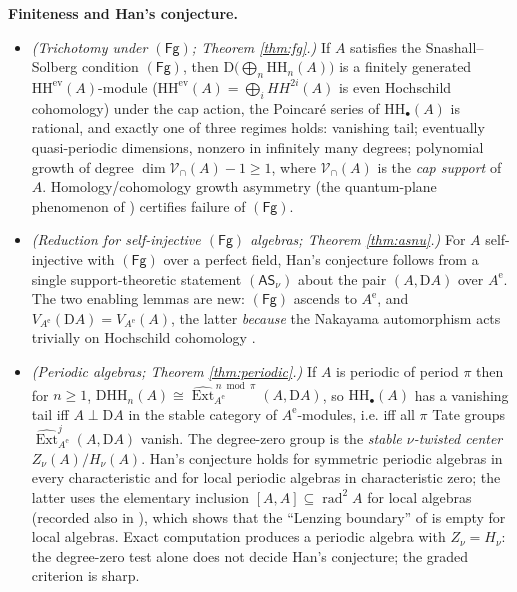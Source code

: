 \documentclass[11pt]{amsart}
\theoremstyle{definition}
\newcommand{\HH}{\mathrm{HH}}
\newcommand{\D}{\mathrm{D}}
\newcommand{\sExt}{\widehat{\operatorname{Ext}}}
\newcommand{\rad}{\operatorname{rad}}
\newcommand{\Ae}{A^{\mathrm{e}}}
\newcommand{\Vcap}{\mathcal{V}_{\cap}}
\newcommand{\Fg}{\mathsf{(Fg)}}
\begin{document}
\smallskip
\noindent\textbf{Finiteness and Han's conjecture.}
\begin{itemize}
\item[(F)] \emph{(Trichotomy under $\Fg$; Theorem \ref{thm:fg}.)} If $A$
satisfies the Snashall--Solberg condition $\Fg$, then
$\D\bigl(\bigoplus_n\HH_n(A)\bigr)$ is a finitely generated
$\HH^{\mathrm{ev}}(A)$-module ($\HH^{\mathrm{ev}}(A) = \bigoplus _i HH^{2i}(A)$ is even Hochschild cohomology) under the cap action, the Poincar\'e series of
$\HH_\bullet(A)$ is rational, and exactly one of three regimes holds:
vanishing tail; eventually quasi-periodic dimensions, nonzero in infinitely
many degrees; polynomial growth of degree $\dim\Vcap(A)-1\ge1$, where
$\Vcap(A)$ is the \emph{cap support} of $A$. Homology/cohomology growth
asymmetry (the quantum-plane phenomenon of \cite{BerghErdmann,BGMS})
certifies failure of $\Fg$.
\item[(G)] \emph{(Reduction for self-injective $\Fg$ algebras; Theorem
\ref{thm:asnu}.)} For $A$ self-injective with $\Fg$ over a perfect field,
Han's conjecture follows from a single support-theoretic statement
$\mathsf{(AS_\nu)}$ about the pair $(A,\D A)$ over $\Ae$. The two enabling
lemmas are new: $\Fg$ ascends to $\Ae$, and
$V_{\Ae}(\D A)=V_{\Ae}(A)$, the latter \emph{because} the Nakayama
automorphism acts trivially on Hochschild cohomology
\cite{ArmCox,SuarezAlvarez}.
\item[(H)] \emph{(Periodic algebras; Theorem \ref{thm:periodic}.)} If $A$ is
periodic of period $\pi$ then for $n\geq 1$,
$\D\HH_n(A)\cong\sExt^{\,n\bmod\pi}_{\Ae}(A,\D A)$, so $\HH_\bullet(A)$ has a
vanishing tail iff $A\perp\D A$ in the stable category of $\Ae$-modules, i.e.
iff all $\pi$ Tate groups $\sExt^j_{\Ae}(A,\D A)$ vanish. The degree-zero
group is the \emph{stable $\nu$-twisted center} $Z_\nu(A)/H_\nu(A)$. Han's
conjecture holds for symmetric periodic algebras in every characteristic and
for local periodic algebras in characteristic zero; the latter uses the
elementary inclusion $[A,A]\subseteq\rad^2 A$ for local algebras (recorded
also in \cite[Remark~5.6]{ArmPC}), which shows that the ``Lenzing boundary''
of \cite[Cor.~5.5]{ArmPC} is empty for local algebras. Exact computation
produces a periodic algebra with $Z_\nu=H_\nu$: the degree-zero test alone
does not decide Han's conjecture; the graded criterion is sharp.
\end{itemize}
\end{document}
